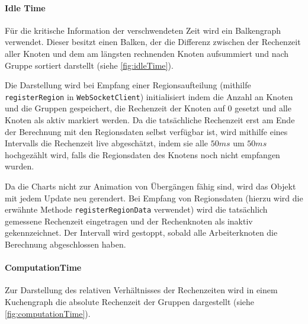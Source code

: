 \paragraph{Idle Time}
Für die kritische Information der verschwendeten Zeit wird ein Balkengraph verwendet.
Dieser besitzt einen Balken, der die Differenz zwischen der Rechenzeit aller Knoten und dem am längsten rechnenden Knoten
aufsummiert und nach Gruppe sortiert darstellt (siehe \autoref{fig:idleTime}).

Die Darstellung wird bei Empfang einer Regionsaufteilung (mithilfe \verb|registerRegion| in \verb|WebSocketClient|)
initialisiert indem die Anzahl an Knoten und die Gruppen gespeichert, die Rechenzeit der Knoten auf \( 0 \) gesetzt und
alle Knoten als aktiv markiert werden.
Da die tatsächliche Rechenzeit erst am Ende der Berechnung mit den Regionsdaten selbst verfügbar ist,
wird mithilfe eines Intervalls die Rechenzeit live abgeschätzt, indem sie alle \( 50ms \) um
\( 50ms \) hochgezählt wird, falls die Regionsdaten des Knotens noch nicht empfangen wurden.

Da die Charts nicht zur Animation von Übergängen fähig sind, wird das Objekt mit jedem Update neu gerendert.
Bei Empfang von Regionsdaten (hierzu wird die erwähnte Methode \verb|registerRegionData| verwendet)
wird die tatsächlich gemessene Rechenzeit eingetragen und der Rechenknoten als inaktiv gekennzeichnet.
Der Intervall wird gestoppt, sobald alle Arbeiterknoten die Berechnung abgeschlossen haben.

\paragraph{ComputationTime}

Zur Darstellung des relativen Verhältnisses der Rechenzeiten wird in einem Kuchengraph
die absolute Rechenzeit der Gruppen dargestellt (siehe \autoref{fig:computationTime}).
